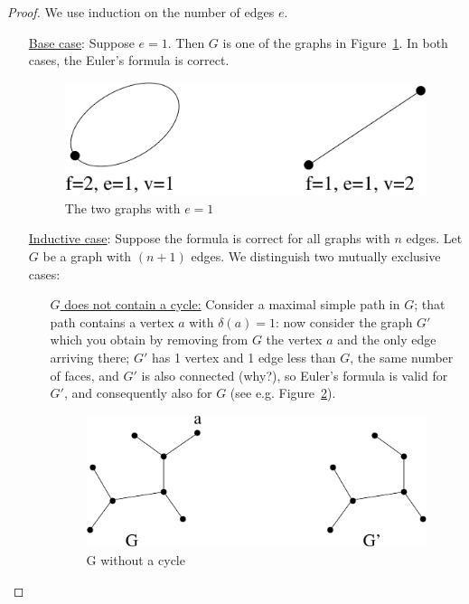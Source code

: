 \begin{proof} We use induction on the number of edges $e$. 
\begin{itemize}
\item[\underline{Base case}:]
Suppose
$e=1$. Then $G$ is one of the graphs in Figure~\ref{euler1}. In
both cases, the Euler's formula is correct.  

\begin{figure}[ht]
\begin{center}
\includegraphics[width=0.4\linewidth,keepaspectratio]{euler1}
\end{center}
\caption{The two graphs with $e=1$ \label{euler1}}
\end{figure}


\item[\underline{Inductive case}:]
Suppose the formula is
correct for all graphs with $n$ edges. Let $G$ be a graph with $(n+1)$
edges. We distinguish two mutually exclusive cases:
\begin{itemize}
\item[\underline{$G$ does not contain a cycle:}]
Consider a maximal
simple path in $G$; that path contains a vertex $a$ with $\delta(a) =
1$: now consider the graph $G'$ which you obtain by removing from $G$
the vertex $a$ and the only edge arriving there; $G'$ has 1 vertex
and 1 edge less than $G$, the same number of faces, and $G'$ is also
connected (why?), so Euler's formula is valid for $G'$, and
consequently also for $G$ (see e.g. Figure~\ref{euler2}).\\
\begin{figure}[ht]
\begin{center}
\includegraphics[width=0.4\linewidth,keepaspectratio]{euler2}
\end{center}
\caption{G without a cycle \label{euler2}}
\end{figure}


\end{itemize}
\end{itemize}
\end{proof}
